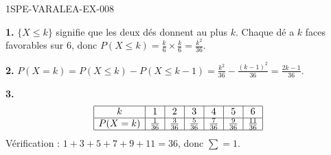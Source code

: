 \begin{corrige}{1SPE-VARALEA-EX-008}

\textbf{1.} $\{X \leq k\}$ signifie que les deux dés donnent au plus $k$. Chaque dé a $k$ faces favorables sur $6$, donc $P(X \leq k) = \frac{k}{6} \times \frac{k}{6} = \frac{k^2}{36}$.

\medskip
\textbf{2.} $P(X=k) = P(X \leq k) - P(X \leq k-1) = \frac{k^2}{36} - \frac{(k-1)^2}{36} = \frac{2k-1}{36}$.

\medskip
\textbf{3.}
\[
\begin{array}{|c|c|c|c|c|c|c|}
\hline
k & 1 & 2 & 3 & 4 & 5 & 6 \\
\hline
P(X=k) & \frac{1}{36} & \frac{3}{36} & \frac{5}{36} & \frac{7}{36} & \frac{9}{36} & \frac{11}{36} \\
\hline
\end{array}
\]
Vérification : $1+3+5+7+9+11=36$, donc $\sum = 1$. \checkmark

\end{corrige}
